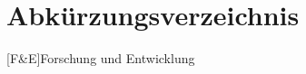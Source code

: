 \section*{Abkürzungsverzeichnis}
\begin{acronym}[AAAAAAA]
    [F\&E]{Forschung und Entwicklung}
\end{acronym}
